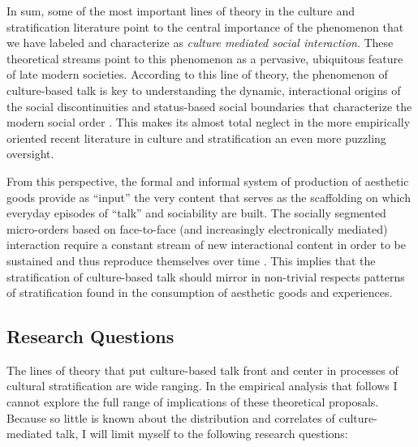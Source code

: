 \documentclass[11pt]{article}
\begin{document}
In sum, some of the most important lines of theory in the culture and stratification literature point to the central importance of the phenomenon that we have labeled and characterize as \emph{culture mediated social interaction}.  These theoretical streams point to this phenomenon as a pervasive, ubiquitous feature of late modern societies.  According to this line of theory, the phenomenon of culture-based talk is key to understanding the dynamic, interactional origins of the social discontinuities and status-based social boundaries that characterize the modern social order \citep{illouz97}. This makes its almost total neglect in the more empirically oriented recent literature in culture and stratification an even more puzzling oversight. 

From this perspective, the formal and informal system of production of aesthetic goods provide as ``input'' the very content that serves as the scaffolding on which everyday episodes of ``talk'' and sociability are built.  The socially segmented micro-orders based on face-to-face (and increasingly electronically mediated) interaction require a constant stream of new interactional content in order to be sustained and thus reproduce themselves over time \citep{collins81, collins04, dimaggio87, lizardo06a}. This implies that the stratification of culture-based talk should mirror in non-trivial respects patterns of stratification found in the consumption of aesthetic goods and experiences.

\subsection{Research Questions}
The lines of theory that put culture-based talk front and center in processes of cultural stratification are wide ranging.  In the empirical analysis that follows I cannot explore the full range of implications of these theoretical proposals.  Because so little is known about the distribution and correlates of culture-mediated talk, I will limit myself to the following research questions:
\end{document}
